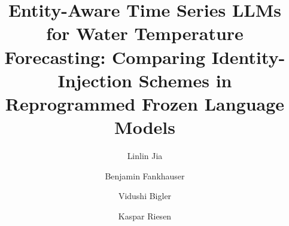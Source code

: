 \documentclass[sigconf,review]{acmart}
\begin{document}
\title[Entity-Aware Time Series LLMs for Water Temperature Forecasting]{Entity-Aware
Time Series LLMs for Water Temperature Forecasting: Comparing Identity-Injection
Schemes in Reprogrammed Frozen Language Models}

\author{Linlin Jia}

\author{Benjamin Fankhauser}
\email{}

\author{Vidushi Bigler}
\email{}

\author{Kaspar Riesen}
\end{document}
